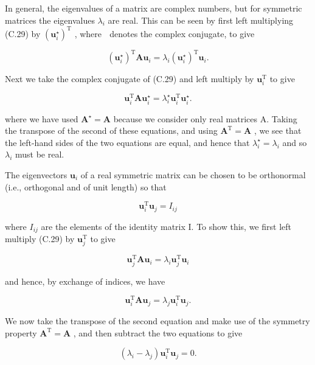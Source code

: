 \documentclass[
  10
]{article}
\begin{document}
In general, the eigenvalues of a matrix are complex numbers, but for
symmetric matrices the eigenvalues \(\lambda _ { i }\) are real. This
can be seen by first left multiplying (C.29) by
\(( \mathbf { u } _ { i } ^ { \star } ) ^ { \mathrm { T } }\) , where 
denotes the complex conjugate, to give

\[
\left(\mathbf {u} _ {i} ^ {\star}\right) ^ {\mathrm{T}} \mathbf {A u} _ {i} = \lambda_ {i} \left(\mathbf {u} _ {i} ^ {\star}\right) ^ {\mathrm{T}} \mathbf {u} _ {i}.\tag{C.31}
\]

Next we take the complex conjugate of (C.29) and left multiply by
\({ \mathbf { u } } _ { i } ^ { \mathrm { T } }\) to give

\[
\mathbf {u} _ {i} ^ {\mathrm{T}} \mathbf {A} \mathbf {u} _ {i} ^ {\star} = \lambda_ {i} ^ {\star} \mathbf {u} _ {i} ^ {\mathrm{T}} \mathbf {u} _ {i} ^ {\star}.\tag{C.32}
\]

where we have used \(\mathbf { A } ^ { \star } = \mathbf { A }\) because
we consider only real matrices A. Taking the transpose of the second of
these equations, and using
\(\mathbf { A } ^ { \mathrm { T } } = \mathbf { A }\) , we see that the
left-hand sides of the two equations are equal, and hence that
\(\lambda _ { i } ^ { \star } = \lambda _ { i }\) and so
\(\lambda _ { i }\) must be real.

The eigenvectors \(\mathbf { u } _ { i }\) of a real symmetric matrix
can be chosen to be orthonormal (i.e., orthogonal and of unit length) so
that

\[
\mathbf {u} _ {i} ^ {\mathrm{T}} \mathbf {u} _ {j} = I _ {i j}\tag{C.33}
\]

where \(I _ { i j }\) are the elements of the identity matrix I. To show
this, we first left multiply (C.29) by
\(\mathbf { u } _ { j } ^ { \mathrm { T } }\) to give

\[
\mathbf {u} _ {j} ^ {\mathrm{T}} \mathbf {A} \mathbf {u} _ {i} = \lambda_ {i} \mathbf {u} _ {j} ^ {\mathrm{T}} \mathbf {u} _ {i}\tag{C.34}
\]

and hence, by exchange of indices, we have

\[
\mathbf {u} _ {i} ^ {\mathrm{T}} \mathbf {A} \mathbf {u} _ {j} = \lambda_ {j} \mathbf {u} _ {i} ^ {\mathrm{T}} \mathbf {u} _ {j}.\tag{C.35}
\]

We now take the transpose of the second equation and make use of the
symmetry property \(\mathbf { A } ^ { \mathrm { T } } = \mathbf { A }\)
, and then subtract the two equations to give

\[
\left(\lambda_ {i} - \lambda_ {j}\right) \mathbf {u} _ {i} ^ {\mathrm{T}} \mathbf {u} _ {j} = 0.\tag{C.36}
\]
\end{document}
